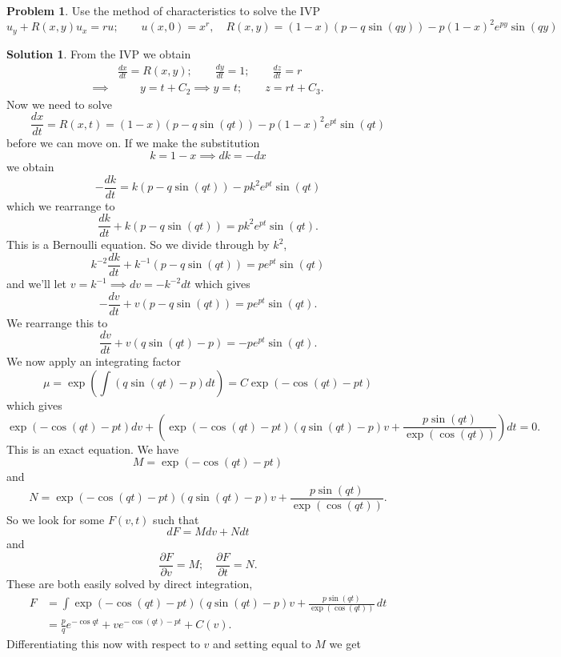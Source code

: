 \documentclass[10pt]{article}
\theoremstyle{definition}
\newtheorem{problem}{Problem}
\newtheorem{soln}{Solution}
\begin{document}
\begin{problem}
Use the method of characteristics to solve the IVP
$$u_y+R(x,y)u_x=ru;\qquad u(x,0)=x^r,\quad R(x,y)=\left(1-x\right)\left(p-q\sin\left(qy\right)\right)-p\left(1-x\right)^2e^{py}\sin\left(qy\right)$$
\end{problem}
\begin{soln}
  From the IVP we obtain
  \begin{align*}
             & \frac{dx}{dt}=R(x,y); \qquad \frac{dy}{dt}=1; \qquad \frac{dz}{dt}=r \\
    \implies & \qquad y=t+C_2\implies y=t; \qquad z=rt+C_3.
  \end{align*}
  Now we need to solve
  $$\frac{dx}{dt}=R(x,t)=\left(1-x\right)\left(p-q\sin\left(qt\right)\right)-p\left(1-x\right)^2e^{pt}\sin\left(qt\right)$$
  before we can move on.
  If we make the substitution
  $$k=1-x\implies dk=-dx$$
  we obtain
  $$-\frac{dk}{dt}=k\left(p-q\sin\left(qt\right)\right)-pk^2e^{pt}\sin\left(qt\right)$$
  which we rearrange to
  $$\frac{dk}{dt}+k\left(p-q\sin\left(qt\right)\right)=pk^2e^{pt}\sin\left(qt\right).$$
  This is a Bernoulli equation. So we divide through by $k^2$,
  $$k^{-2}\frac{dk}{dt}+k^{-1}\left(p-q\sin\left(qt\right)\right)=pe^{pt}\sin\left(qt\right)$$
  and we'll let $v=k^{-1}\implies dv = -k^{-2}dt$ which gives
  $$-\frac{dv}{dt}+v\left(p-q\sin\left(qt\right)\right)=pe^{pt}\sin\left(qt\right).$$
  We rearrange this to
  $$\frac{dv}{dt}+v\left(q\sin\left(qt\right)-p\right)=-pe^{pt}\sin\left(qt\right).$$
  We now apply an integrating factor
  $$\mu=\exp\left(\int \left(q\sin\left(qt\right)-p\right)dt\right)=C\exp\left(-\cos(qt)-pt\right)$$
  which gives
  $$\exp\left(-\cos(qt)-pt\right)dv+\left(\exp\left(-\cos(qt)-pt\right)\left(q\sin (qt)-p\right)v+\frac{p\sin(qt)}{\exp(\cos(qt))}\right)dt=0.$$
  This is an exact equation.
  We have
  $$M=\exp\left(-\cos(qt)-pt\right)$$
  and
  $$N=\exp\left(-\cos(qt)-pt\right)\left(q\sin (qt)-p\right)v+\frac{p\sin(qt)}{\exp(\cos(qt))}.$$
  So we look for some $F(v,t)$ such that
  $$dF=Mdv+Ndt$$
  and
  $$\frac{\partial F}{\partial v}=M;\quad \frac{\partial F}{\partial t}= N.$$
  These are both easily solved by direct integration,
  \begin{align*}
    F & =\int \exp\left(-\cos(qt)-pt\right)\left(q\sin (qt)-p\right)v+\frac{p\sin(qt)}{\exp(\cos(qt))}\,dt\\
      & =\frac{p}{q}e^{-\cos qt}+ve^{-\cos (qt)-pt}+C(v).
  \end{align*}
  Differentiating this now with respect to $v$ and setting equal to $M$ we get

\end{soln}
\end{document}
